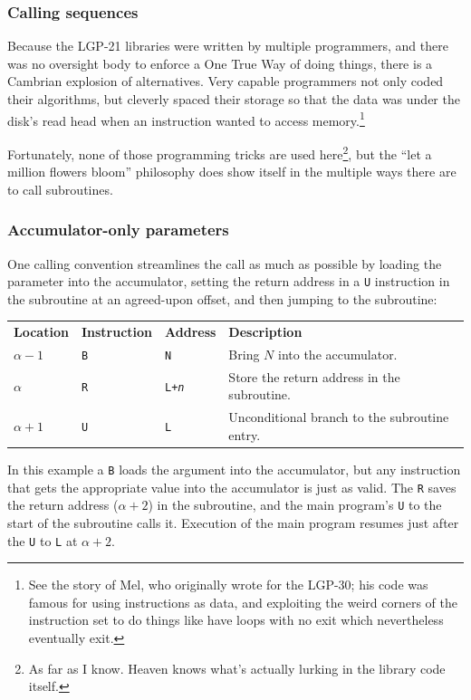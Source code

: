 \subsubsection{Calling sequences}
Because the LGP-21 libraries were written by multiple programmers, and there was no oversight body to enforce a One True Way of doing things, there is a Cambrian explosion of alternatives. Very capable programmers not only coded their algorithms, but cleverly spaced their storage so that the data was under the disk's read head when an instruction wanted to access memory.\footnote{See the story of Mel\cite{storyofmel}, who originally wrote for the LGP-30; his code was famous for using instructions as data, and exploiting the weird corners of the instruction set to do things like have loops with no exit which nevertheless eventually exit.}

Fortunately, none of those programming tricks are used here\footnote{As far as I know. Heaven knows what's actually lurking in the library code itself.}, but the ``let a million flowers bloom'' philosophy does show itself in the multiple ways there are to call subroutines.

\label{subsec:standard-call1}
\subsubsection*{Accumulator-only parameters}
One calling convention streamlines the call as much as possible by loading the parameter into the accumulator, setting the return address in a \texttt{U} instruction in the subroutine at an agreed-upon offset, and then jumping to the subroutine:
\begin{center}
\begin{tabularx}{\textwidth}{lllX}
\textbf{Location} & \textbf{Instruction} & \textbf{Address} & \textbf{Description} \\
$\alpha-1$      & \texttt{B}            & \texttt{N}       & Bring $N$ into the accumulator. \\
$\alpha$      & \texttt{R}            & \texttt{L+\textit{n}}    & Store the return address in the subroutine. \\
$\alpha+1$      & \texttt{U}            & \texttt{L}       & Unconditional branch to the subroutine entry. \\
\end{tabularx}
\end{center}

In this example a \texttt{B} loads the argument into the accumulator, but any instruction that gets the appropriate value into the accumulator is just as valid. The \texttt{R} saves the return address ($\alpha+2$) in the subroutine, and the main program's \texttt{U} to the start of the subroutine calls it. Execution of the main program resumes just after the \texttt{U} to \texttt{L} at $\alpha+2$.

